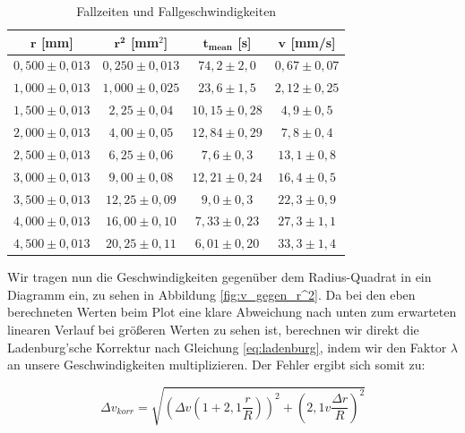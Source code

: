 \documentclass{article}
\begin{document}
\phantom{.}

\begin{table}[!h]
    \centering
    \begin{tabular}{cccc}
        \hline
        $\bm{r}$ [mm] & $\bm{r^2}$ [mm$^2$] & $\bm{t_{mean}}$ [s] & $\bm{v}$ [mm/s]  \\ \hline
        $0,500 \pm  0,013$   & $0,250 \pm  0,013$ & $74,2 \pm 2,0$  & $0,67 \pm 0,07$    \\
        $1,000 \pm  0,013$   & $1,000 \pm 0,025$ & $23,6 \pm 1,5$   & $2,12 \pm 0,25$    \\
        $1,500 \pm  0,013$   & $2,25 \pm 0,04$   & $10,15 \pm 0,28$ & $4,9 \pm 0,5$    \\
        $2,000 \pm  0,013$   & $4,00  \pm 0,05$  & $12,84 \pm 0,29$ & $7,8 \pm 0,4$    \\
        $2,500 \pm  0,013$   & $6,25  \pm 0,06$  & $7,6 \pm 0,3$    & $13,1 \pm 0,8$    \\
        $3,000 \pm  0,013$   & $9,00  \pm 0,08$  & $12,21 \pm 0,24$ & $16,4 \pm 0,5$    \\
        $3,500 \pm  0,013$   & $12,25  \pm 0,09$ & $9,0 \pm 0,3$    & $22,3 \pm 0,9$    \\
        $4,000 \pm  0,013$   & $16,00  \pm 0,10$ & $7,33 \pm 0,23$  & $27,3 \pm 1,1$    \\
        $4,500 \pm  0,013$   & $20,25  \pm 0,11$ & $6,01 \pm 0,20$  & $33,3 \pm 1,4$    \\ \hline
    \end{tabular}%
    \caption{Fallzeiten und Fallgeschwindigkeiten}
    \label{tab:t_mean&v}
\end{table}

\phantom{.}

Wir tragen nun die Geschwindigkeiten gegenüber dem Radius-Quadrat in ein Diagramm ein, zu sehen in Abbildung \ref{fig:v_gegen_r^2}. Da bei den eben berechneten Werten beim Plot eine klare Abweichung nach unten zum erwarteten linearen Verlauf bei größeren Werten zu sehen ist, berechnen wir direkt die Ladenburg'sche Korrektur nach Gleichung \ref{eq:ladenburg}, indem wir den Faktor $\lambda$ an unsere Geschwindigkeiten multiplizieren. Der Fehler ergibt sich somit zu:

\begin{equation}
    \Delta v_{korr} = \sqrt{\left( \Delta v  \left( 1 + 2,1 \frac{r}{R} \right) \right)^2 + \left( 2,1 v \frac{\Delta r}{R}  \right)^2}
\end{equation}
\end{document}
